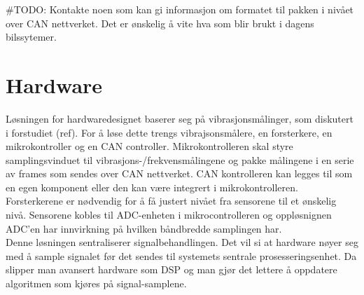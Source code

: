 
#TODO: Kontakte noen som kan gi informasjon om formatet til pakken i nivået over
CAN nettverket. Det er ønskelig å vite hva som blir brukt i dagens bilssytemer.

\section{Hardware}

Løsningen for hardwaredesignet baserer seg på vibrasjonsmålinger, som diskutert
i forstudiet (ref). For å løse dette trengs vibrajsonsmålere, en forsterkere,
en mikrokontroller og en CAN controller. Mikrokontrolleren skal styre
samplingsvinduet til vibrasjons-/frekvensmålingene og pakke målingene i en serie
av frames som sendes over CAN nettverket. CAN kontrolleren kan legges til som en
egen komponent eller den kan være integrert i mikrokontrolleren. Forsterkerene er
nødvendig for å få justert nivået fra sensorene til et ønskelig nivå. Sensorene
kobles til ADC-enheten i mikrocontrolleren og oppløsnignen ADC'en
har innvirkning på hvilken båndbredde samplingen har. \\

Denne løsningen sentraliserer signalbehandlingen. Det vil si at hardware nøyer
seg med å sample signalet før det sendes til systemets sentrale
prosesseringsenhet. Da slipper man avansert hardware som DSP og man gjør det
lettere å oppdatere algoritmen som kjøres på signal-samplene.
